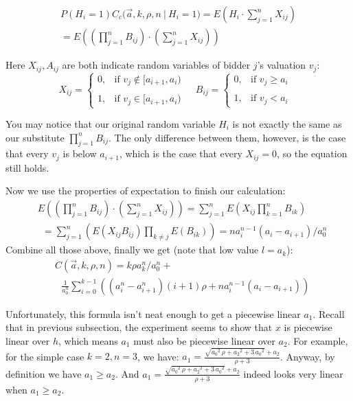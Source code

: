 \begin{align*}
P(H_i = 1)C_c\big(\vec a, k, \rho, n ~\big|~ H_i = 1 \big) = E\left( H_i \cdot
    \sum_{j=1}^n X_{ij}\right) \\
= E\left( \left( \prod_{j=1}^n B_{ij} \right) \cdot \left(\sum_{j=1}^n X_{ij}
    \right) \right)
\end{align*}

Here $X_{ij}, A_{ij}$ are both indicate random variables of bidder $j$'s valuation $v_j$:
$$
X_{ij} = \begin{cases}
    0, &\mbox{if $v_j \notin [a_{i+1}, a_{i})$ } \\\\
    1, &\mbox{if $v_j \in [a_{i+1}, a_{i})$}
\end{cases}
~~
B_{ij} = \begin{cases}
    0, &\mbox{if $v_j \geq a_{i}$ } \\\\
    1, &\mbox{if $v_j < a_{i}$}
\end{cases}
$$

You may notice that our original random variable $H_i$ is not exactly the same
as our substitute $\prod_{j=1}^n B_{ij}$. The only difference between them,
however, is the case that every $v_j$ is below $a_{i+1}$, which is the case
that every $X_{ij} = 0$, so the equation still holds.

Now we use the properties of expectation to finish our calculation:
\begin{align*}
  &E\left( \left( \prod_{j=1}^n B_{ij} \right) \cdot \left(\sum_{j=1}^n X_{ij}
  \right) \right) = \sum_{j=1}^n E\left( X_{ij} \prod_{k=1}^nB_{ik} \right)
  \\
    &~~ = \sum_{j=1}^n \left( E(X_{ij} B_{ij}) \prod_{k \neq j} E(B_{ik})
    \right)
       = n a_{i}^{n-1} (a_{i}-a_{i+1}) / a_0^n
\end{align*}
Combine all those above, finally we get (note that low value $l = a_k$):
\begin{align}
& C(\vec a, k, \rho, n) = k \rho a_k^n / a_0^n + \nonumber\\ 
    &~~~ \frac{1}{a_0^n} \sum_{i=0}^{k-1} \left( (a_{i}^n-a_{i+1}^n) (i+1)
    \rho + n a_{i}^{n-1} (a_{i}-a_{i+1}) \right) \label{eq:C_general}
\end{align}

Unfortunately, this formula isn't neat enough to get a piecewise linear $a_1$.
Recall that in previous subsection, the experiment seems to show that $x$ is
piecewise linear over $h$, which means $a_1$ must also be piecewise linear over
$a_2$.  For example, for the simple case $k = 2, n = 3$, we have: $a_1 =
\frac{\sqrt{{a_0}^{2}\,\rho+{a_2}^{2}+3\,{a_0}^{2}}+a_2}{\rho+3}$.  Anyway,
by definition we have $a_1 \geq a_2$. And
$a_1=\frac{\sqrt{{a_0}^{2}\,\rho+{a_2}^{2}+3\,{a_0}^{2}}+a_2}{\rho+3}$ indeed
looks very linear when $a_1 \geq a_2$.

